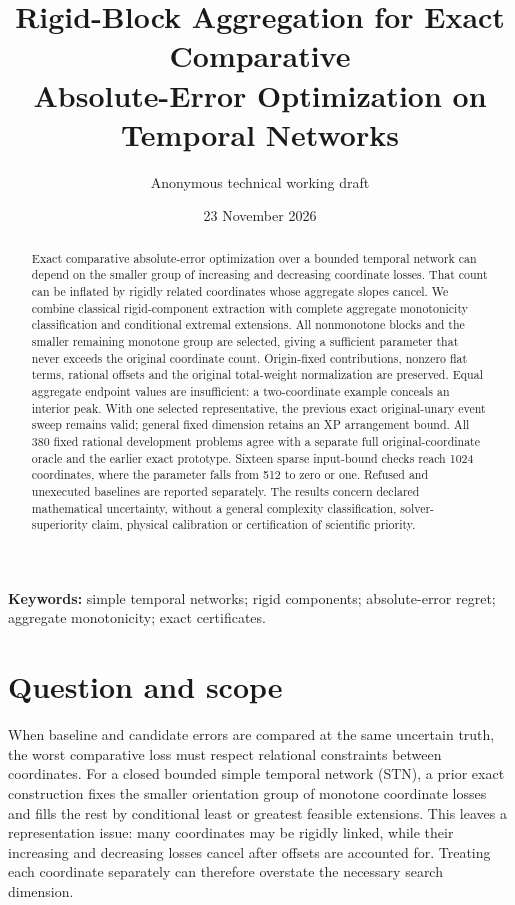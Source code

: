 \documentclass[10pt,a4paper]{article}
\title{Rigid-Block Aggregation for Exact Comparative\\Absolute-Error Optimization on Temporal Networks}
\author{Anonymous technical working draft}
\date{23 November 2026}
\begin{document}
\maketitle
\begin{abstract}
Exact comparative absolute-error optimization over a bounded temporal network
can depend on the smaller group of increasing and decreasing coordinate losses.
That count can be inflated by rigidly related coordinates whose aggregate
slopes cancel. We combine classical rigid-component extraction with complete
aggregate monotonicity classification and conditional extremal extensions.
All nonmonotone blocks and the smaller remaining monotone group are selected,
giving a sufficient parameter that never exceeds the original coordinate count.
Origin-fixed contributions, nonzero flat terms, rational offsets and the
original total-weight normalization are preserved. Equal aggregate endpoint
values are insufficient: a two-coordinate example conceals an interior peak.
With one selected representative, the previous exact original-unary event
sweep remains valid; general fixed dimension retains an XP arrangement bound.
All 380 fixed rational development problems agree with a separate full
original-coordinate oracle and the earlier exact prototype. Sixteen sparse
input-bound checks reach 1024 coordinates, where the parameter falls from
512 to zero or one. Refused and unexecuted baselines are reported separately.
The results concern declared mathematical uncertainty, without a general
complexity classification, solver-superiority claim, physical calibration
or certification of scientific priority.
\end{abstract}
\noindent\textbf{Keywords:} simple temporal networks; rigid components;
absolute-error regret; aggregate monotonicity; exact certificates.
\section{Question and scope}
When baseline and candidate errors are compared at the same uncertain truth,
the worst comparative loss must respect relational constraints between coordinates.
For a closed bounded simple temporal network (STN), a prior exact construction
fixes the smaller orientation group of monotone coordinate losses and fills
the rest by conditional least or greatest feasible extensions. This leaves a
representation issue: many coordinates may be rigidly linked, while their
increasing and decreasing losses cancel after offsets are accounted for.
Treating each coordinate separately can therefore overstate the necessary
search dimension.
\end{document}
